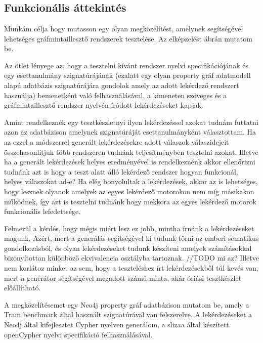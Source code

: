 \chapter{\attekintes}

\section{Funkcionális áttekintés}

Munkám célja hogy mutasson egy olyan megközelítést, amelynek segítségével lehetséges gráfmintaillesztő rendszerek tesztelése. Az elképzelést  ábrán mutatom be.

Az ötlet lényege az, hogy a tesztelni kívánt rendszer nyelvi specifikációjának és egy esettanulmány szignatúrájának (ezalatt egy olyan property gráf adatmodell alapú adatbázis szignatúrájára gondolok amely az adott lekérdező rendszert használja) bemenetként való felhasználásával, a kimeneten szöveges és a gráfmintaillesztő rendszer nyelvén íródott lekérdezéseket kapjak. 

Amint rendelkeznék egy tesztkészletnyi ilyen lekérdezéssel azokat tudnám futtatni azon az adatbázison amelynek szignatúráját esettanulmányként választottam. Ha az ezzel a módszerrel generált lekérdezésekre adott válaszok válaszidejeit összehasonlítjuk több rendszeren tudnánk teljesítményben tesztelni azokat. Illetve ha a generált lekérdezések helyes eredményével is rendelkeznénk akkor ellenőrizni tudnánk azt is hogy a teszt alatt álló lekérdező rendszer hogyan funkcionál, helyes válaszokat ad-e? Ha elég bonyolultak a lekérdezések, akkor az is lehetséges, hogy lesznek olyanok amelyek az egyes lekérdező motorokon nem míg másikakon működnek, így azt is tesztelni tudnánk hogy mekkora az egyes lekérdező motorok funkcionális lefedettsége.
    
Felmerül a kérdés, hogy mégis miért lesz ez jobb, mintha írnánk a lekérdezéseket magunk. Azért, mert a generálás segítségével ki tudunk törni az emberi sematikus gondolkozásból, és olyan lekérdezéseket tudunk készíteni amelyek számításokkal bizonyítottan különböző ekvivalencia osztályba tartoznak. //TODO mi az? Illetve nem korlátoz minket az sem, hogy a teszteléshez írt lekérdezésekből túl kevés van, mert a generátor segítségével megadott számú minta, akár óriási tesztkészlet előállítható.

A megközelítésemet egy Neo4j \cite{neo4j} property gráf adatbázison mutatom be, amely a Train benchmark \cite{szarnyas2018train} által használt szignatúrával van felszerelve. A  lekérdezéseket a Neo4j által kifejlesztet Cypher \cite{Cypher} nyelven generálom, a slizaa \cite{slizaa_2018} által készített openCypher nyelvi specifikáció felhasználásával. 


